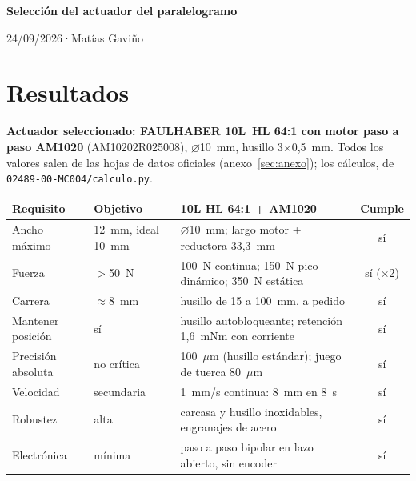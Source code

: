 \documentclass[11pt,a4paper]{article}
\newcommand{\titulo}{Selección del actuador del paralelogramo}
\newcommand{\autor}{Matías Gaviño}
\newcommand{\fecha}{24/09/2026}                    %
\newcommand{\cabecera}{%
  \thispagestyle{fancy}%
  {\fontsize{20}{24}\selectfont\bfseries\titulo\par}%
  \vspace{5pt}%
  {\small\color{gris-medio}\fecha\quad·\quad\autor\par}%
  \vspace{6pt}}
\begin{document}
\cabecera

\section{Resultados}
\textbf{Actuador seleccionado: FAULHABER 10L~HL 64:1 con motor paso a paso AM1020}
(AM10202R025008), $\varnothing$10~mm, husillo 3$\times$0,5~mm. Todos los valores salen de las hojas de
datos oficiales (anexo~\ref{sec:anexo}); los cálculos, de \texttt{02489-00-MC004/calculo.py}.

\begin{table}[H]\centering\footnotesize\setlength{\tabcolsep}{4pt}
\begin{tabular}{l l l c}
\toprule
Requisito & Objetivo & 10L HL 64:1 + AM1020 & Cumple\\
\midrule
Ancho máximo           & 12~mm, ideal 10~mm & $\varnothing$10~mm; largo motor + reductora 33,3~mm & sí\\
Fuerza                 & $>$50~N            & 100~N continua; 150~N pico dinámico; 350~N estática & sí ($\times$2)\\
Carrera                & $\approx$8~mm      & husillo de 15 a 100~mm, a pedido & sí\\
Mantener posición      & sí                 & husillo autobloqueante; retención 1,6~mNm con corriente & sí\\
Precisión absoluta     & no crítica         & 100~$\mu$m (husillo estándar); juego de tuerca 80~$\mu$m & sí\\
Velocidad              & secundaria         & 1~mm/s continua: 8~mm en 8~s & sí\\
Robustez               & alta               & carcasa y husillo inoxidables, engranajes de acero & sí\\
Electrónica            & mínima             & paso a paso bipolar en lazo abierto, sin encoder & sí\\
\bottomrule
\end{tabular}
\end{table}
\end{document}
